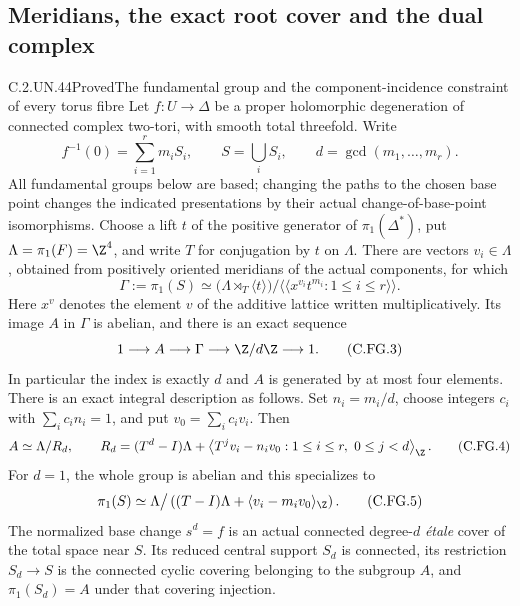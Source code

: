 \subsection{Meridians, the exact root cover and the dual complex}

\begin{statement}{C.2.UN.44}{Proved}{The fundamental group and the component-incidence constraint of every torus fibre}
Let $f:U\to\Delta$ be a proper holomorphic degeneration of connected
complex two-tori, with smooth total threefold. Write
\[
 f^{-1}(0)=\sum_{i=1}^r m_iS_i,\qquad
 S=\bigcup_iS_i,\qquad d=\gcd(m_1,\ldots,m_r).
                                                        \tag{C.FG.1}
\]
All fundamental groups below are based; changing the paths to the
chosen base point changes the indicated presentations by their actual
change-of-base-point isomorphisms. Choose a lift $t$ of the positive
generator of $\pi_1(\Delta^*)$, put $\Lambda=\pi_1(F)=\Z^4$, and
write $T$ for conjugation by $t$ on $\Lambda$. There are vectors
$v_i\in\Lambda$, obtained from positively oriented meridians of the
actual components, for which
\[
 \Gamma:=\pi_1(S)
  \simeq
  \bigl(\Lambda\rtimes_T\langle t\rangle\bigr)
       \big/\langle\!\langle x^{v_i}t^{m_i}:1\le i\le r
                    \rangle\!\rangle .                \tag{C.FG.2}
\]
Here $x^v$ denotes the element $v$ of the additive lattice written
multiplicatively. Its image $A$ in $\Gamma$ is abelian, and there is
an exact sequence
\[
       1\longrightarrow A\longrightarrow\Gamma
          \longrightarrow\Z/d\Z\longrightarrow1 .    \tag{C.FG.3}
\]
In particular the index is exactly $d$ and $A$ is generated by at most
four elements. There is an exact integral description as follows.
Set $n_i=m_i/d$, choose integers $c_i$ with $\sum_i c_in_i=1$, and
put $v_0=\sum_i c_iv_i$. Then
\[
 A\simeq\Lambda/R_d,\qquad
 R_d=(T^d-I)\Lambda+
       \left\langle T^jv_i-n_iv_0:
                         1\le i\le r,\ 0\le j<d\right\rangle_{\Z}.
                                                        \tag{C.FG.4}
\]
For $d=1$, the whole group is abelian and this specializes to
\[
 \pi_1(S)\simeq
   \Lambda\big/\left((T-I)\Lambda+
                   \langle v_i-m_iv_0\rangle_{\Z}\right).
                                                        \tag{C.FG.5}
\]
The normalized base change $s^d=f$ is an actual connected degree-$d$
\emph{\'etale} cover of the total space near $S$. Its reduced central
support $S_d$ is connected, its restriction $S_d\to S$ is the
connected cyclic covering belonging to the subgroup $A$, and
$\pi_1(S_d)=A$ under that covering injection.


\end{statement}
